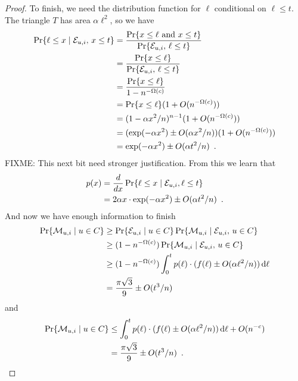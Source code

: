 \documentclass{patmorin}
\begin{document}
\begin{proof}
To finish, we need the distribution function for $\ell$ conditional on $\ell\le t$.  The triangle
$T$ has area $\alpha\ell^2$, so we have 
\begin{align*}
   \Pr\{\ell \le x\mid \mathcal{E}_{u,i},\,x\le t\} 
      & = \frac{\Pr\{x\le \ell\mbox{ and } x\le t\}}
               {\Pr\{\mathcal{E}_{u,i},\, \ell\le t\}} \\
      & = \frac{\Pr\{x\le \ell\}}
               {\Pr\{\mathcal{E}_{u,i},\, \ell\le t\}} \\
      & = \frac{\Pr\{x\le \ell\}}
               {1-n^{-\Omega(c)}} \\
      & = \Pr\{x\le \ell\}(1+O(n^{-\Omega(c)})) \\
      & = (1-\alpha x^2/n)^{n-1}(1+O(n^{-\Omega(c)})) \\
      & = (\exp(-\alpha x^2)\pm O(\alpha x^2/n))(1+O(n^{-\Omega(c)})) \\
      & = \exp(-\alpha x^2)\pm O(\alpha t^2/n) \enspace .
\end{align*}
FIXME: This next bit need stronger justification. From this we learn that 
\begin{align*}
   p(x) & = \frac{d}{dx}\Pr\{\ell \le x\mid \mathcal{E}_{u,i}, \ell\le t\} \\
        & = 2\alpha x\cdot\exp(-\alpha x^2)\pm O(\alpha t^2/n) \enspace .
\end{align*}
And now we have enough information to finish
\begin{align*}
    \Pr\{\mathcal{M}_{u,i} \mid u\in C\} 
         & \ge \Pr\{\mathcal{E}_{u,i}\mid u\in C\}\Pr\{\mathcal{M}_{u,i}\mid \mathcal{E}_{u,i},\, u\in C\} \\
         & \ge (1-n^{-\Omega(c)})\Pr\{\mathcal{M}_{u,i}\mid \mathcal{E}_{u,i},\, u\in C\} \\
         & \ge (1-n^{-\Omega(c)})\int_0^t p(\ell)\cdot(f(\ell)\pm O(\alpha\ell^2/n))\,\mathrm{d}{\ell} \\
        & = \frac{\pi\sqrt{3}}{9} \pm O(t^3/n)
\end{align*}
and
\begin{align*}
    \Pr\{\mathcal{M}_{u,i} \mid u\in C\} 
         & \le \int_0^t p(\ell)\cdot(f(\ell)\pm O(\alpha\ell^2/n))\,\mathrm{d}{\ell} + O(n^{-c}) \\
       & = \frac{\pi\sqrt{3}}{9} \pm O(t^3/n) \enspace .
\end{align*}

\end{proof}
\end{document}
